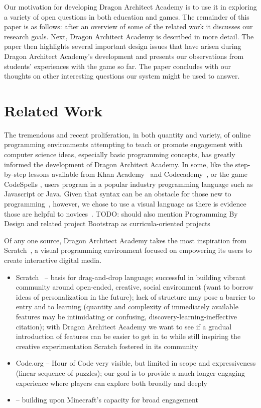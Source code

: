 \documentclass{sig-alternate}
\newcommand{\TODO}[1]{{\color{red} TODO: #1}}
\newcommand{\gametitle}{{\color{RoyalPurple} Dragon Architect Academy}}
\begin{document}
Our motivation for developing \gametitle{} is to use it in exploring a variety of open questions in both education and games. The remainder of this paper is as follows: after an overview of some of the related work it discusses our research goals. Next, \gametitle{} is described in more detail. The paper then highlights several important design issues that have arisen during \gametitle{}'s development and presents our observations from students' experiences with the game so far. The paper concludes with our thoughts on other interesting questions our system might be used to answer.


\section{Related Work}
The tremendous and recent proliferation, in both quantity and variety, of online programming environments attempting to teach or promote engagement with computer science ideas, especially basic programming concepts, has greatly informed the development of \gametitle{}. In some, like the step-by-step lessons available from Khan Academy~\cite{khanacademy} and Codecademy~\cite{codecademy}, or the game CodeSpells \cite{esper2013codespells}, users program in a popular industry programming language such as Javascript or Java. Given that syntax can be an obstacle for those new to programming~\cite{stefik2013syntax}, however, we chose to use a visual language as there is evidence those are helpful to novices~\cite{whitley1997visual}. \TODO{should also mention Programming By Design and related project Bootstrap as curricula-oriented projects}

Of any one source, \gametitle{} takes the most inspiration from Scratch~\cite{maloney2010scratch}, a visual programming environment focused on empowering its users to create interactive digital media.
\begin{itemize}
\item Scratch~\cite{maloney2010scratch} -- basis for drag-and-drop language; successful in building vibrant community around open-ended, creative, social environment (want to borrow ideas of personalization in the future); lack of structure may pose a barrier to entry and to learning (quantity and complexity of immediately available features may be intimidating or confusing, discovery-learning-ineffective citation); with \gametitle{} we want to see if a gradual introduction of features can be easier to get in to while still inspiring the creative experimentation Scratch fostered in its community
\item Code.org -- Hour of Code very visible, but limited in scope and expressiveness (linear sequence of puzzles); our goal is to provide a much longer engaging experience where players can explore both broadly and deeply
\item \cite{zorn2013minecraft} -- building upon Minecraft's capacity for broad engagement
\end{itemize}
\end{document}
